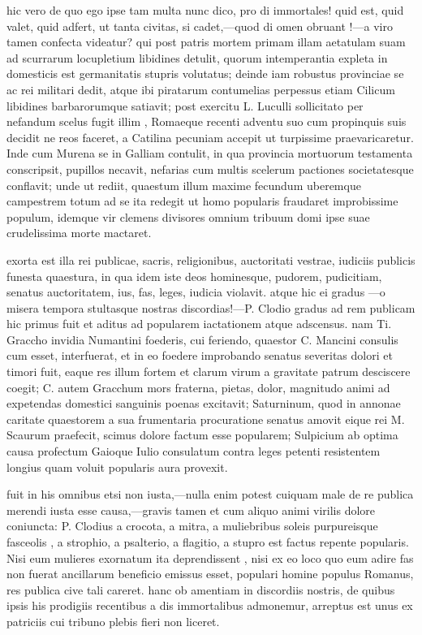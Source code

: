  hic vero de quo ego ipse tam multa nunc dico, pro di immortales! quid est, quid valet, quid adfert, ut tanta civitas, si cadet,—quod di omen obruant !—a viro tamen confecta videatur? qui post patris mortem primam illam aetatulam suam ad scurrarum locupletium libidines detulit, quorum intemperantia expleta in domesticis est germanitatis stupris volutatus; deinde iam robustus provinciae se ac rei militari dedit, atque ibi piratarum contumelias perpessus etiam Cilicum libidines barbarorumque satiavit; post exercitu L. Luculli sollicitato per nefandum scelus fugit illim , Romaeque recenti adventu suo cum propinquis suis decidit ne reos faceret, a Catilina pecuniam accepit ut turpissime praevaricaretur. Inde cum Murena se in Galliam contulit, in qua provincia mortuorum testamenta conscripsit, pupillos necavit, nefarias cum multis scelerum pactiones societatesque conflavit; unde ut rediit, quaestum illum maxime fecundum uberemque campestrem totum ad se ita redegit ut homo popularis fraudaret improbissime populum, idemque vir clemens divisores omnium tribuum domi ipse suae crudelissima morte mactaret.

 exorta est illa rei publicae, sacris, religionibus, auctoritati vestrae, iudiciis publicis funesta quaestura, in qua idem iste deos hominesque, pudorem, pudicitiam, senatus auctoritatem, ius, fas, leges, iudicia violavit. atque hic ei gradus —o misera tempora stultasque nostras discordias!—P. Clodio gradus ad rem publicam hic primus fuit et aditus ad popularem iactationem atque adscensus. nam Ti. Graccho invidia Numantini foederis, cui feriendo, quaestor C. Mancini consulis cum esset, interfuerat, et in eo foedere improbando senatus severitas dolori et timori fuit, eaque res illum fortem et clarum virum a gravitate patrum desciscere coegit; C. autem Gracchum mors fraterna, pietas, dolor, magnitudo animi ad expetendas domestici sanguinis poenas excitavit; Saturninum, quod in annonae caritate quaestorem a sua frumentaria procuratione senatus amovit eique rei M. Scaurum praefecit, scimus dolore factum esse popularem; Sulpicium ab optima causa profectum Gaioque Iulio consulatum contra leges petenti resistentem longius quam voluit popularis aura provexit.

 fuit in his omnibus etsi non iusta,—nulla enim potest cuiquam male de re publica merendi iusta esse causa,—gravis tamen et cum aliquo animi virilis dolore coniuncta: P. Clodius a crocota, a mitra, a muliebribus soleis purpureisque fasceolis , a strophio, a psalterio, a flagitio, a stupro est factus repente popularis. Nisi eum mulieres exornatum ita deprendissent , nisi ex eo loco quo eum adire fas non fuerat ancillarum beneficio emissus esset, populari homine populus Romanus, res publica cive tali careret. hanc ob amentiam in discordiis nostris, de quibus ipsis his prodigiis recentibus a dis immortalibus admonemur, arreptus est unus ex patriciis cui tribuno plebis fieri non liceret.

